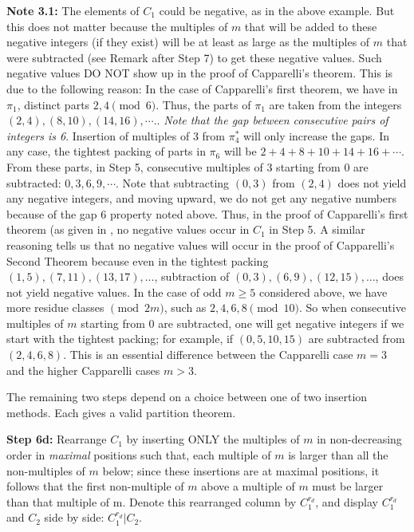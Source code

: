 \documentclass[12pt,a4paper]{amsart}
\theoremstyle{definition}
\theoremstyle{notation}
\theoremstyle{corollary}
\begin{document}
\textbf{Note 3.1:} The elements of $C_1$ could be negative, as in the above example. But this does not matter because the multiples of $m$ that will be added to these negative integers (if they exist) will be at least as large as the multiples of $m$ that were subtracted (see Remark after Step 7) to get these negative values. Such negative values DO NOT show up in the proof of Capparelli's theorem. This is due to the following reason: In the case of Capparelli's first theorem, we have
in $\pi_1$, distinct parts $2,4\pmod{6}$. Thus, the parts of $\pi_1$ are taken from the integers $(2,4), (8,10), (14,16), \cdots.$. {\it{Note that the gap between consecutive pairs of integers is 6}}. Insertion of multiples of 3 from $\pi^*_4$ will only increase the gaps. In any case, the tightest packing of parts in $\pi_6$ will be $2+4+8+10+14+16+\cdots$. From these parts, in Step 5, consecutive multiples of $3$ starting from $0$ are subtracted: $0, 3, 6, 9, \cdots$. Note that subtracting $(0,3)$ from $(2,4)$ does not yield any negative integers, and moving upward, we do not get any negative numbers because of the gap 6 property noted above. Thus, in the proof of Capparelli's first theorem (as given in \cite{KAGEABG95}, no negative values occur in $C_1$ in Step 5. A similar reasoning tells us that no negative values will occur in the proof of Capparelli's Second Theorem because even in the tightest packing $(1,5), (7,11), (13,17), \dots$, subtraction of $(0,3), (6,9), (12,15), \dots$, does not yield negative values. In the case of odd $m \ge 5$ considered above, we have more residue classes $\pmod{2m}$, such as $2,4,6,8 \pmod{10}$. So when consecutive multiples of $m$ starting from $0$ are subtracted, one will get negative integers if we start with the tightest packing; for example, if $(0,5, 10, 15)$ are subtracted from $(2,4,6,8)$. This is an essential difference between the Capparelli case $m=3$ and the higher Capparelli cases $m>3$.


\medskip

The remaining two steps depend on a choice between one of two insertion methods. Each gives a
valid partition theorem.\medskip

\textbf{Step 6d:} Rearrange $C_1$ by inserting ONLY the multiples of $m$ in non-decreasing order in {\it{maximal}} positions such that, each multiple of $m$ is larger than
all the non-multiples of $m$ below; since these insertions are at maximal positions, it follows that the first non-multiple of $m$ above a multiple of $m$ must be
larger than that multiple of m. Denote this rearranged column by $C^{r_d}_1$, and display $C^{r_d}_1$ and $C_2$ side by side: $C^{r_d}_1|C_2$. 
\end{document}
